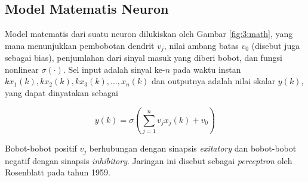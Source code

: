 \subsection{Model Matematis Neuron}

Model matematis dari suatu neuron dilukiskan oleh Gambar \ref{fig:3:math}, yang mana menunjukkan pembobotan dendrit $v_j$, nilai ambang batas $v_0$ (disebut juga sebagai bias), penjumlahan dari sinyal masuk yang diberi bobot, dan fungsi nonlinear $\sigma(\cdot)$. Sel input adalah sinyal ke-$n$ pada waktu instan 	$kx_1(k), kx_2(k), kx_3(k),...,x_n(k)$ dan outputnya adalah nilai skalar $y(k)$, yang dapat dinyatakan sebagai

\begin{equation} \label{eq:3:perceptron}
y(k) = \sigma \left( \sum_{j=1}^{n}v_jx_j(k)+v_0 \right)
\end{equation}

Bobot-bobot positif  $v_j$ berhubungan dengan sinapsis \textit{exitatory} dan bobot-bobot negatif dengan sinapsis \textit{inhibitory}. Jaringan ini disebut sebagai \textit{perceptron} oleh Rosenblatt pada tahun 1959. \cite{NNControlBook}

